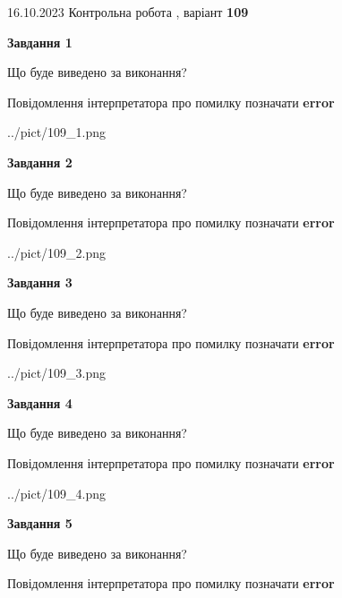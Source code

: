 \documentclass[12pt, ukrainian]{article}
\begin{document}
{\Large{16.10.2023 Контрольна робота , варіант  \No \textbf { 109 }\par}}
{
\begin {large}
{\begin {center}\textbf{Завдання 1}\end {center}}\par
Що буде виведено за виконання? \par
Повідомлення інтерпретатора про помилку позначати \textbf{error}

\begin{center}
	{../pict/109_1.png}
\end{center}
\newpage

{\begin {center}\textbf{Завдання 2}\end {center}}\par
Що буде виведено за виконання? \par
Повідомлення інтерпретатора про помилку позначати \textbf{error}

\begin{center}
	{../pict/109_2.png}
\end{center}
\newpage

{\begin {center}\textbf{Завдання 3}\end {center}}\par
Що буде виведено за виконання? \par
Повідомлення інтерпретатора про помилку позначати \textbf{error}

\begin{center}
	{../pict/109_3.png}
\end{center}
\newpage

{\begin {center}\textbf{Завдання 4}\end {center}}\par
Що буде виведено за виконання? \par
Повідомлення інтерпретатора про помилку позначати \textbf{error}

\begin{center}
	{../pict/109_4.png}
\end{center}
\newpage

{\begin {center}\textbf{Завдання 5}\end {center}}\par
Що буде виведено за виконання? \par
Повідомлення інтерпретатора про помилку позначати \textbf{error}


\end{large}}
\end{document}
